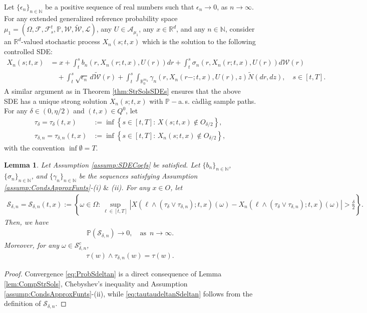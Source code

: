 \documentclass[amscd,amssymb,11pt]{article}
\newtheorem{lemma}[theorem]{Lemma}
\numberwithin{theorem}{section}
\numberwithin{equation}{section}
\begin{document}
Let $\{\epsilon_{n}\}_{n\in\mathbb{N}}$ be a positive sequence of real numbers such that $\epsilon_{n}\rightarrow 0$, as $n\rightarrow\infty$. For any extended generalized reference probability space $\mu_{1}=(\Omega,\mathscr{F},\mathscr{F}_{s}^{t},\mathbb{P},\mathcal{W},\widetilde{\mathcal{W}},\mathcal{L})$, any $U\in\mathcal{A}_{\mu_{1}}$, any $x\in\mathbb{R}^{d}$, and any $n\in\mathbb{N}$, consider an $\mathbb{R}^{d}$-valued stochastic process $X_{n}(s;t,x)$ which is the solution to the following controlled SDE:
\begin{align*}
X_{n}(s;t,x)&=x+\int_{t}^{s}b_{n}\left(r,X_{n}(r;t,x),U(r)\right)dr+\int_{t}^{s}\sigma_{n}\left(r,X_{n}(r;t,x),U(r)\right)d\mathcal{W}(r)\\
&\quad +\int_{t}^{s}\sqrt{\epsilon_{n}}\,d\widetilde{\mathcal{W}}(r)+\int_{t}^{s}\!\int_{\mathbb{R}^{m_{2}}_{0}}\gamma_{n}\left(r,X_{n}(r-;t,x),U(r),z\right)\widetilde{N}(dr,dz),\quad s\in[t,T].
\end{align*}
A similar argument as in Theorem \ref{thm:StrSolsSDEs} ensures that the above SDE has a unique strong solution $X_{n}(s;t,x)$ with $\mathbb{P}-$a.$\,$s. c\`{a}dl\`{a}g sample paths. For any $\delta\in(0,\eta/2)$ and $(t,x)\in Q^{0}$, let
\begin{align*}
\tau_{\delta}=\tau_{\delta}(t,x)&:=\inf\left\{s\in[t,T]:\,X(s;t,x)\not\in O_{\delta/2}\right\},\\
\tau_{\delta,n}=\tau_{\delta,n}(t,x)&:=\inf\left\{s\in[t,T]:\,X_{n}(s;t,x)\not\in O_{\delta/2}\right\},
\end{align*}
with the convention $\inf\emptyset=T$.
\begin{lemma}\label{lem:ProbSndelta}
Let Assumption \ref{assump:SDECoefs} be satisfied. Let $\{b_{n}\}_{n\in\mathbb{N}}$, $\{\sigma_{n}\}_{n\in\mathbb{N}}$, and $\{\gamma_{n}\}_{n\in\mathbb{N}}$ be the sequences satisfying Assumption \ref{assump:CondsApproxFunts}-(i) {\rm $\&$} (ii). For any $x\in O$, let
\begin{align*}
\mathcal{S}_{\delta,n}=\mathcal{S}_{\delta,n}(t,x):=\left\{\omega\in\Omega:\sup_{\ell\in[t,T]}\left|X\!\left(\ell\!\wedge\!(\tau_{\delta}\!\vee\!\tau_{\delta,n});t,x\right)\!(\omega)-X_{n}\!\left(\ell\!\wedge\!(\tau_{\delta}\!\vee\!\tau_{\delta,n});t,x\right)\!(\omega)\right|>\frac{\delta}{2}\right\}.
\end{align*}
Then, we have
\begin{align}\label{eq:ProbSdeltan}
\mathbb{P}(\mathcal{S}_{\delta,n})\rightarrow 0,\quad\text{as }\,n\rightarrow\infty.
\end{align}
Moreover, for any $\omega\in\mathcal{S}_{\delta,n}^{c}$,
\begin{align}\label{eq:tautaudeltanSdeltan}
\tau(w)\wedge\tau_{\delta,n}(w)=\tau(w).
\end{align}
\end{lemma}
\begin{proof}
Convergence \eqref{eq:ProbSdeltan} is a direct consequence of Lemma \ref{lem:CompStrSols}, Chebyshev's inequality and Assumption \ref{assump:CondsApproxFunts}-(ii), while \eqref{eq:tautaudeltanSdeltan} follows from the definition of $\mathcal{S}_{\delta,n}$.
\end{proof}
\end{document}
